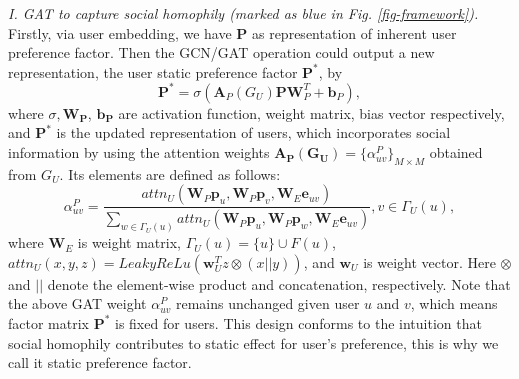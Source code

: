 \documentclass[sigconf]{acmart}
\begin{document}
\emph{I. GAT to capture social homophily (marked as blue in Fig. \ref{fig-framework}).} 
Firstly, via user embedding, we have $\mathbf {P}$ as representation of inherent user preference factor. 
Then the GCN/GAT operation could output a new representation{, the user static preference factor $\mathbf P^*$,} by
\begin{equation}
\mathbf P^* = \sigma(\mathbf {A}_P(G_U)\mathbf {P}\mathbf {W}_P^T+\mathbf {b}_P),
\end{equation}
where $\sigma, \mathbf{{W}_P}$, $\mathbf{{b}_P}$ are activation function, weight matrix, bias vector respectively, and $\mathbf{P^*}$ is the {updated} representation of users, which incorporates social information by using the attention weights $\mathbf{A_P(G_U)}= \{\alpha^P_{uv}\}_{M\times M}$ obtained from $G_U$. 
Its elements are defined as follows:
\begin{equation}\nonumber
\alpha^P_{uv} = \frac{ attn_U(\mathbf W_P \mathbf p_u, \mathbf W_P \mathbf p_v, \mathbf W_E \mathbf e_{uv})}{\sum_{w\in  \Gamma_U(u)}attn_U(\mathbf W_P \mathbf p_u, \mathbf W_P \mathbf p_w, \mathbf W_E\mathbf e_{uv})}, v\in \Gamma_U(u),
\end{equation}
where $\mathbf W_E$ is weight matrix, $\Gamma_U(u) = \{u\}\cup F(u)$, $attn_U(x,y,z)=LeakyReLu(\mathbf w_U^Tz\otimes(x||y))$, and $\mathbf w_U$ is weight vector. Here $\otimes$ and $||$ denote the element-wise product and concatenation, respectively.
Note that the above GAT weight $\alpha^P_{uv}$ remains unchanged given user $u$ and $v$, which means factor matrix $\mathbf P^*$ is fixed for users. 
This design conforms to the intuition that social homophily contributes to static effect for user's preference, {this is why} we call it static preference factor.
\end{document}
